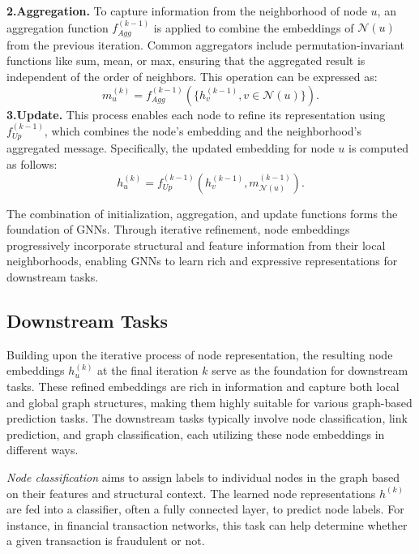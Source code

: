 \noindent\textbf{2.Aggregation.}
To capture information from the neighborhood of node $u$, an aggregation function $f_{Agg}^{(k-1)}$ is applied to combine the embeddings of $\mathcal{N}(u)$ from the previous iteration. 
Common aggregators include permutation-invariant functions like sum, mean, or max, ensuring that the aggregated result is independent of the order of neighbors. This operation can be expressed as:
\begin{equation}
m_u^{(k)} = f_{Agg}^{(k-1)}(\{h_v^{(k-1)},v\in \mathcal{N}(u)\}).
\end{equation}
\noindent\textbf{3.Update.}
This process enables each node to refine its representation using $f_{Up}^{(k-1)}$, which combines the node's embedding and the neighborhood's aggregated message.
Specifically, the updated embedding for node $u$ is computed as follows:
\begin{equation}
h_u^{(k)} = f_{Up}^{(k-1)}(h_v^{(k-1)},m_{\mathcal{N}(u)}^{(k-1)}).
\end{equation}

The combination of initialization, aggregation, and update functions forms the foundation of GNNs. Through iterative refinement, node embeddings progressively incorporate structural and feature information from their local neighborhoods, enabling GNNs to learn rich and expressive representations for downstream tasks.

\subsection{Downstream Tasks}
\label{downstream}
Building upon the iterative process of node representation, the resulting node embeddings $h_u^{(k)}$ at the final iteration $k$ serve as the foundation for downstream tasks. These refined embeddings are rich in information and capture both local and global graph structures, making them highly suitable for various graph-based prediction tasks. The downstream tasks typically involve node classification, link prediction, and graph classification, each utilizing these node embeddings in different ways.

\textit{Node classification} aims to assign labels to individual nodes in the graph based on their features and structural context. The learned node representations $h^{(k)}$ are fed into a classifier, often a fully connected layer, to predict node labels. For instance, in financial transaction networks, this task can help determine whether a given transaction is fraudulent or not. 

